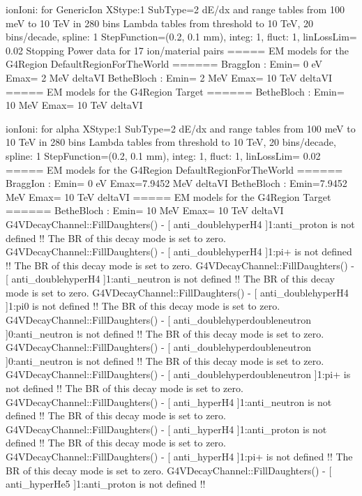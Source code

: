 ionIoni:  for GenericIon  XStype:1  SubType=2
      dE/dx and range tables from 100 meV to 10 TeV in 280 bins
      Lambda tables from threshold to 10 TeV, 20 bins/decade, spline: 1
      StepFunction=(0.2, 0.1 mm), integ: 1, fluct: 1, linLossLim= 0.02
      Stopping Power data for 17 ion/material pairs
      ===== EM models for the G4Region  DefaultRegionForTheWorld ======
            BraggIon : Emin=    0 eV  Emax=    2 MeV  deltaVI
          BetheBloch : Emin=    2 MeV Emax=   10 TeV  deltaVI
      ===== EM models for the G4Region  Target ======
          BetheBloch : Emin=   10 MeV Emax=   10 TeV  deltaVI

ionIoni:  for alpha  XStype:1  SubType=2
      dE/dx and range tables from 100 meV to 10 TeV in 280 bins
      Lambda tables from threshold to 10 TeV, 20 bins/decade, spline: 1
      StepFunction=(0.2, 0.1 mm), integ: 1, fluct: 1, linLossLim= 0.02
      ===== EM models for the G4Region  DefaultRegionForTheWorld ======
            BraggIon : Emin=    0 eV  Emax=7.9452 MeV  deltaVI
          BetheBloch : Emin=7.9452 MeV Emax=   10 TeV  deltaVI
      ===== EM models for the G4Region  Target ======
          BetheBloch : Emin=   10 MeV Emax=   10 TeV  deltaVI
G4VDecayChannel::FillDaughters() - [ anti_doublehyperH4 ]1:anti_proton is not defined !!
 The BR of this decay mode is set to zero.
G4VDecayChannel::FillDaughters() - [ anti_doublehyperH4 ]1:pi+ is not defined !!
 The BR of this decay mode is set to zero.
G4VDecayChannel::FillDaughters() - [ anti_doublehyperH4 ]1:anti_neutron is not defined !!
 The BR of this decay mode is set to zero.
G4VDecayChannel::FillDaughters() - [ anti_doublehyperH4 ]1:pi0 is not defined !!
 The BR of this decay mode is set to zero.
G4VDecayChannel::FillDaughters() - [ anti_doublehyperdoubleneutron ]0:anti_neutron is not defined !!
 The BR of this decay mode is set to zero.
G4VDecayChannel::FillDaughters() - [ anti_doublehyperdoubleneutron ]0:anti_neutron is not defined !!
 The BR of this decay mode is set to zero.
G4VDecayChannel::FillDaughters() - [ anti_doublehyperdoubleneutron ]1:pi+ is not defined !!
 The BR of this decay mode is set to zero.
G4VDecayChannel::FillDaughters() - [ anti_hyperH4 ]1:anti_neutron is not defined !!
 The BR of this decay mode is set to zero.
G4VDecayChannel::FillDaughters() - [ anti_hyperH4 ]1:anti_proton is not defined !!
 The BR of this decay mode is set to zero.
G4VDecayChannel::FillDaughters() - [ anti_hyperH4 ]1:pi+ is not defined !!
 The BR of this decay mode is set to zero.
G4VDecayChannel::FillDaughters() - [ anti_hyperHe5 ]1:anti_proton is not defined !!
